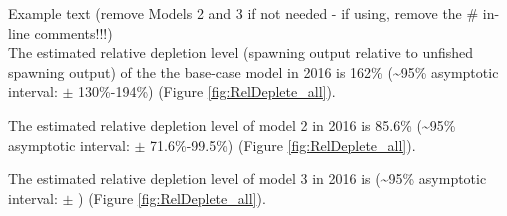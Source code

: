 \documentclass[12pt,]{article}
\begin{document}
Example text (remove Models 2 and 3 if not needed - if using, remove the
\# in-line comments!!!)\\
The estimated relative depletion level (spawning output relative to
unfished spawning output) of the the base-case model in 2016 is 162\%
(\textasciitilde{}95\% asymptotic interval: \(\pm\) 130\%-194\%) (Figure
\ref{fig:RelDeplete_all}).

The estimated relative depletion level of model 2 in 2016 is 85.6\%
(\textasciitilde{}95\% asymptotic interval: \(\pm\) 71.6\%-99.5\%)
(Figure \ref{fig:RelDeplete_all}).

The estimated relative depletion level of model 3 in 2016 is
(\textasciitilde{}95\% asymptotic interval: \(\pm\) ) (Figure
\ref{fig:RelDeplete_all}).

\FloatBarrier
\end{document}
